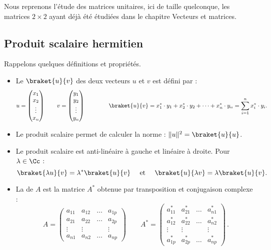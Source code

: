 \documentclass[11pt,class=report,crop=false]{standalone}
\begin{document}
Nous reprenons l'étude des matrices unitaires, ici de taille quelconque, les matrices $2\times 2$ ayant déjà été étudiées dans le chapitre \og{}Vecteurs et matrices\fg{}.




\subsection{Produit scalaire hermitien}

Rappelons quelques définitions et propriétés.

\begin{itemize}
  \item Le  $\braket{u}{v}$ des deux vecteurs $u$ et $v$ est défini par :
$$u = \begin{pmatrix}x_1\\x_2\\\vdots\\x_n\end{pmatrix} \qquad 
v = \begin{pmatrix}y_1\\y_2\\\vdots\\y_n\end{pmatrix}
\qquad\qquad \braket{u}{v} = x_1^* \cdot y_1 + x_2^* \cdot y_2 + \cdots + x_n^* \cdot y_n = \sum_{i=1}^n x_i^* \cdot y_i.$$

  \item Le produit scalaire permet de calculer la norme : $\|u\|^2 = \braket{u}{u}$.

  \item Le produit scalaire est anti-linéaire à gauche et linéaire à droite. Pour $\lambda\in\Cc$ :
$$\displaystyle
\braket{ \lambda u}{v} = \lambda^* \braket{u}{v}
\quad \text{ et } \quad \braket{u}{\lambda v} = \lambda \braket{u}{v}.
$$

  \item La  de $A$ est la  matrice $A^*$ obtenue par transposition et conjugaison complexe :
$$
A = \left(
\begin{array}{cccc}
a_{11} & a_{12} & \dots & a_{1p}\\
a_{21} & a_{22} & \dots & a_{2p}\\
\vdots & \vdots &&\vdots\\
a_{n1} & a_{n2} & \dots & a_{np}
\end{array}\right)
\qquad 
A^* = \left(
\begin{array}{cccc}
a_{11}^* & a_{21}^* & \dots & a_{n1}^*\\
a_{12}^* & a_{22}^* & \dots & a_{n2}^*\\
\vdots & \vdots &&\vdots\\
a_{1p}^* & a_{2p}^* &\dots & a_{np}^*
\end{array}\right)\, .
$$


\end{itemize}
\end{document}
